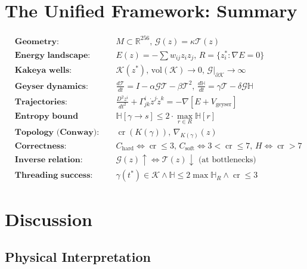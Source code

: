 \documentclass[12pt]{article}
\begin{document}
\section{The Unified Framework: Summary}

\begin{equation*}
\boxed{
\begin{aligned}
&\textbf{Geometry: } && M \subset \mathbb{R}^{256}, \, \mathcal{G}(z) = \kappa \mathcal{T}(z) \\[0.5em]
&\textbf{Energy landscape: } && E(z) = -\sum w_{ij} z_i z_j, \, R = \{z^*_i : \nabla E = 0\} \\[0.5em]
&\textbf{Kakeya wells: } && \mathcal{K}(z^*), \, \text{vol}(\mathcal{K}) \to 0, \, \mathcal{G}|_{\partial \mathcal{K}} \to \infty \\[0.5em]
&\textbf{Geyser dynamics: } && \frac{d\mathcal{T}}{dt} = I - \alpha \mathcal{G} \mathcal{T} - \beta \mathcal{T}^2, \, \frac{d\mathbb{H}}{dt} = \gamma \mathcal{T} - \delta \mathcal{G} \mathbb{H} \\[0.5em]
&\textbf{Trajectories: } && \frac{D^2 z^i}{dt^2} + \Gamma^i_{jk} \dot{z}^j \dot{z}^k = -\nabla[E + V_{\text{geyser}}] \\[0.5em]
&\textbf{Entropy bound (Tao): } && \mathbb{H}[\gamma \to s] \le 2 \cdot \max_{r \in R} \mathbb{H}[r] \\[0.5em]
&\textbf{Topology (Conway): } && \operatorname{cr}(K(\gamma)), \, \nabla_{K(\gamma)}(z) \\[0.5em]
&\textbf{Correctness: } && C_{\text{hard}} \iff \operatorname{cr} \le 3, \, C_{\text{soft}} \iff 3 < \operatorname{cr} \le 7, \, H \iff \operatorname{cr} > 7 \\[0.5em]
&\textbf{Inverse relation: } && \mathcal{G}(z) \uparrow \iff \mathcal{T}(z) \downarrow \text{ (at bottlenecks)} \\[0.5em]
&\textbf{Threading success: } && \gamma(t^*) \in \mathcal{K} \land \mathbb{H} \le 2\max \mathbb{H}_R \land \operatorname{cr} \le 3
\end{aligned}
}
\end{equation*}

\section{Discussion}

\subsection{Physical Interpretation}
\end{document}
